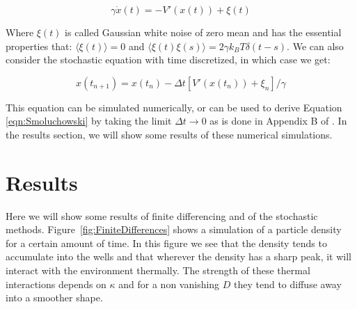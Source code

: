 \documentclass[11pt]{article} %
\begin{document}
\begin{equation}
\gamma \dot{x}(t) = -V'(x(t)) + \xi(t)
\end{equation}

Where $\xi(t)$ is called Gaussian white noise of zero mean and has the essential properties that: $\langle \xi(t) \rangle = 0$ and $\langle \xi(t) \xi(s) \rangle = 2 \gamma k_B T \delta(t - s) $. We can also consider the stochastic equation with time discretized, in which case we get:

\begin{equation}
x(t_{n+1}) = x(t_n) - \Delta t [V'(x(t_n)) + \xi_n]/\gamma
\end{equation}

This equation can be simulated numerically, or can be used to derive Equation \ref{eqn:Smoluchowski} by taking the limit $\Delta t \to 0$ as is done in Appendix B of \cite{Reimann2001}. In the results section, we will show some results of these numerical simulations.

\section{Results}
Here we will show some results of finite differencing and of the stochastic methods. Figure~\ref{fig:FiniteDifferences} shows a simulation of a particle density for a certain amount of time. In this figure we see that the density tends to accumulate into the wells and that wherever the density has a sharp peak, it will interact with the environment thermally. The strength of these thermal interactions depends on $\kappa$ and for a non vanishing $D$ they tend to diffuse away into a smoother shape.
\end{document}

